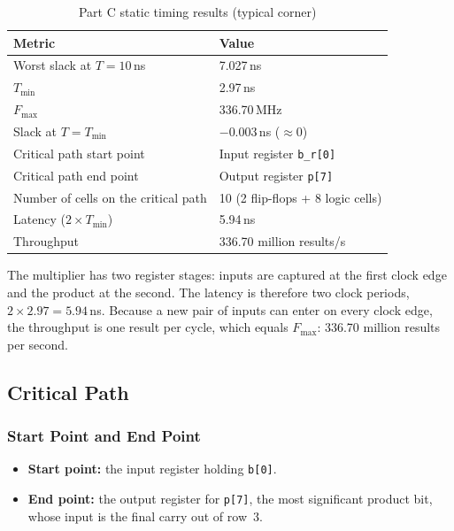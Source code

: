 \documentclass[11pt,a4paper]{article}
\begin{document}
\begin{table}[H]
  \centering
  \begin{tabular}{ll}
    \toprule
    \textbf{Metric} & \textbf{Value} \\
    \midrule
    Worst slack at $T = 10$\,ns & 7.027\,ns \\
    $T_{\min}$ & 2.97\,ns \\
    $F_{\max}$ & 336.70\,MHz \\
    Slack at $T = T_{\min}$ & $-0.003$\,ns ($\approx 0$) \\
    Critical path start point & Input register \texttt{b\_r[0]} \\
    Critical path end point & Output register \texttt{p[7]} \\
    Number of cells on the critical path & 10 (2 flip-flops + 8 logic cells) \\
    Latency ($2 \times T_{\min}$) & 5.94\,ns \\
    Throughput & 336.70 million results/s \\
    \bottomrule
  \end{tabular}
  \caption{Part C static timing results (typical corner)}
  \label{tab:partC_results}
\end{table}

The multiplier has two register stages: inputs are captured at the first
clock edge and the product at the second. The latency is therefore
two clock periods, $2 \times 2.97 = 5.94$\,ns. Because a new pair of inputs
can enter on every clock edge, the throughput is one result per
cycle, which equals $F_{\max}$: 336.70 million results per second.

\subsection{Critical Path}

\subsubsection{Start Point and End Point}

\begin{itemize}
  \item \textbf{Start point:} the input register holding \texttt{b[0]}.
  \item \textbf{End point:} the output register for \texttt{p[7]}, the most
        significant product bit, whose input is the final carry out of
        row~3.
\end{itemize}
\end{document}
